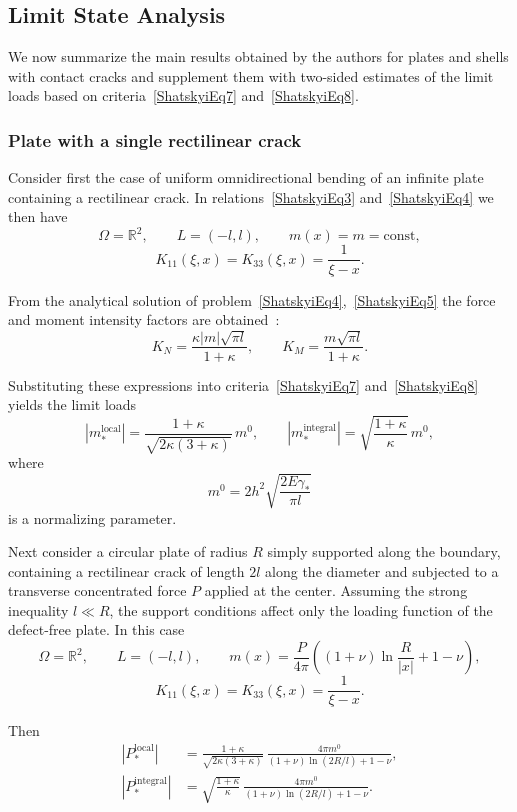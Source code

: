 \subsection{Limit State Analysis}

We now summarize the main results obtained by the authors for plates and shells with contact cracks and supplement them with two-sided estimates of the limit loads based on criteria~\eqref{ShatskyiEq7} and~\eqref{ShatskyiEq8}.

\subsubsection{Plate with a single rectilinear crack}

Consider first the case of uniform omnidirectional bending of an infinite plate containing a rectilinear crack. In relations~\eqref{ShatskyiEq3} and~\eqref{ShatskyiEq4} we then have
\[
\Omega=\mathbb{R}^2,
\qquad
L=(-l,l),
\qquad
m(x)=m=\mathrm{const},
\]
\[
K_{11}(\xi,x)=K_{33}(\xi,x)=\frac{1}{\xi-x}.
\]

From the analytical solution of problem~\eqref{ShatskyiEq4},~\eqref{ShatskyiEq5} the force and moment intensity factors are obtained~\cite{Shatskyi2,Shatskyi3,Shatskyi6}:
\[
K_N=\frac{\kappa |m|\sqrt{\pi l}}{1+\kappa},
\qquad
K_M=\frac{m\sqrt{\pi l}}{1+\kappa}.
\]

Substituting these expressions into criteria~\eqref{ShatskyiEq7} and~\eqref{ShatskyiEq8} yields the limit loads
\begin{equation}
	|m_*^{\text{local}}|
	=
	\frac{1+\kappa}{\sqrt{2\kappa(3+\kappa)}}\,m^0,
	\qquad
	|m_*^{\text{integral}}|
	=
	\sqrt{\frac{1+\kappa}{\kappa}}\,m^0,
	\label{ShatskyiEq9}
\end{equation}
where
\[
m^0=2h^2\sqrt{\frac{2E\gamma_*}{\pi l}}
\]
is a normalizing parameter.

Next consider a circular plate of radius $R$ simply supported along the boundary, containing a rectilinear crack of length $2l$ along the diameter and subjected to a transverse concentrated force $P$ applied at the center. Assuming the strong inequality $l\ll R$, the support conditions affect only the loading function of the defect-free plate. In this case
\[
\Omega=\mathbb{R}^2,
\qquad
L=(-l,l),
\qquad
m(x)=\frac{P}{4\pi}\left((1+\nu)\ln\frac{R}{|x|}+1-\nu\right),
\]
\[
K_{11}(\xi,x)=K_{33}(\xi,x)=\frac{1}{\xi-x}.
\]

Then~\cite{Shatskyi6}
\begin{equation}
	\begin{aligned}
		|P_*^{\text{local}}|
		&=
		\frac{1+\kappa}{\sqrt{2\kappa(3+\kappa)}}
		\,
		\frac{4\pi m^0}{(1+\nu)\ln(2R/l)+1-\nu},
		\\
		|P_*^{\text{integral}}|
		&=
		\sqrt{\frac{1+\kappa}{\kappa}}
		\,
		\frac{4\pi m^0}{(1+\nu)\ln(2R/l)+1-\nu}.
	\end{aligned}
	\label{ShatskyiEq10}
\end{equation}

